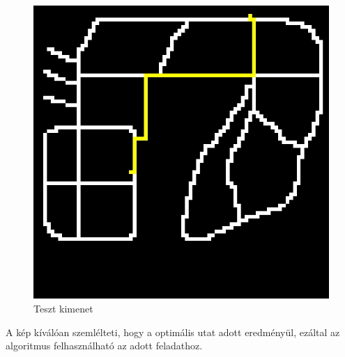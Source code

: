 \begin{figure}[h!]
\centering
\includegraphics[scale=0.6]{images/AStarResult.jpg}
\caption{Teszt kimenet}
\label{fig:model1result}
\end{figure}

A kép kíválóan szemlélteti, hogy a optimális utat adott eredményül, ezáltal az algoritmus felhasználható az adott feladathoz.


